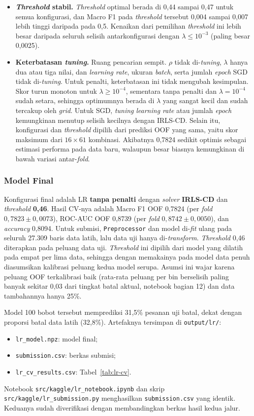 \begin{itemize}
	\item \textbf{\textit{Threshold} stabil.} \textit{Threshold} optimal berada di 0,44 sampai 0,47 untuk semua konfigurasi, dan Macro F1 pada \textit{threshold} tersebut 0,004 sampai 0,007 lebih tinggi daripada pada 0,5. Kenaikan dari pemilihan \textit{threshold} ini lebih besar daripada seluruh selisih antarkonfigurasi dengan $\lambda \le 10^{-3}$ (paling besar 0,0025).
	\item \textbf{Keterbatasan \textit{tuning}.} Ruang pencarian sempit. $\rho$ tidak di-\textit{tuning}, $\lambda$ hanya dua atau tiga nilai, dan \textit{learning rate}, ukuran \textit{batch}, serta jumlah \textit{epoch} SGD tidak di-\textit{tuning}. Untuk penalti, keterbatasan ini tidak mengubah kesimpulan. Skor turun monoton untuk $\lambda \ge 10^{-4}$, sementara tanpa penalti dan $\lambda = 10^{-4}$ sudah setara, sehingga optimumnya berada di $\lambda$ yang sangat kecil dan sudah tercakup oleh \textit{grid}. Untuk SGD, \textit{tuning} \textit{learning rate} atau jumlah \textit{epoch} kemungkinan menutup selisih kecilnya dengan IRLS-CD. Selain itu, konfigurasi dan \textit{threshold} dipilih dari prediksi OOF yang sama, yaitu skor maksimum dari $16 \times 61$ kombinasi. Akibatnya 0,7824 sedikit optimis sebagai estimasi performa pada data baru, walaupun besar biasnya kemungkinan di bawah variasi antar-\textit{fold}.
\end{itemize}

\subsubsection{Model Final}
Konfigurasi final adalah LR \textbf{tanpa penalti} dengan \textit{solver} \textbf{IRLS-CD} dan \textit{threshold} \textbf{0,46}. Hasil CV-nya adalah Macro F1 OOF 0,7824 (per \textit{fold} $0{,}7823 \pm 0{,}0073$), ROC-AUC OOF 0,8739 (per \textit{fold} $0{,}8742 \pm 0{,}0050$), dan \textit{accuracy} 0,8094. Untuk submisi, \texttt{Preprocessor} dan model di-\textit{fit} ulang pada seluruh 27.309 baris data latih, lalu data uji hanya di-\textit{transform}. \textit{Threshold} 0,46 diterapkan pada peluang data uji. \textit{Threshold} ini dipilih dari model yang dilatih pada empat per lima data, sehingga dengan memakainya pada model data penuh diasumsikan kalibrasi peluang kedua model serupa. Asumsi ini wajar karena peluang OOF terkalibrasi baik (rata-rata peluang per bin berselisih paling banyak sekitar 0,03 dari tingkat batal aktual, notebook bagian 12) dan data tambahannya hanya 25\%.

Model 100 bobot tersebut memprediksi 31,5\% pesanan uji batal, dekat dengan proporsi batal data latih (32,8\%). Artefaknya tersimpan di \nolinkurl{output/lr/}:
\begin{itemize}
	\item \texttt{lr\_model.npz}: model final;
	\item \texttt{submission.csv}: berkas submisi;
	\item \texttt{lr\_cv\_results.csv}: Tabel~\ref{tab:lr-cv}.
\end{itemize}
Notebook \nolinkurl{src/kaggle/lr_notebook.ipynb} dan skrip \nolinkurl{src/kaggle/lr_submission.py} menghasilkan \texttt{submission.csv} yang identik. Keduanya sudah diverifikasi dengan membandingkan berkas hasil kedua jalur.
